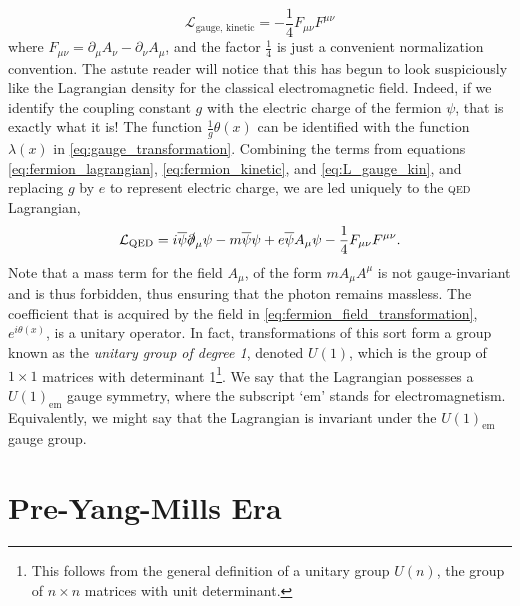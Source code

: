 %
\begin{equation}\label{eq:L_gauge_kin}
\mathcal{L}_\text{gauge, kinetic} = -\frac{1}{4}F_{\mu\nu}F^{\mu\nu}
\end{equation}
%
where $F_{\mu\nu} = \partial_\mu A_\nu - \partial_\nu A_\mu$, and the factor $\frac{1}{4}$ is just a convenient normalization convention. The astute reader will notice that this has begun to look suspiciously like the Lagrangian density for the classical electromagnetic field. Indeed, if we identify the coupling constant $g$ with the electric charge of the fermion $\psi$, that is exactly what it is! The function $\frac{1}{g} \theta(x)$ can be identified with the function $\lambda(x)$ in \eqref{eq:gauge_transformation}. Combining the terms from equations \ref{eq:fermion_lagrangian}, \ref{eq:fermion_kinetic}, and \ref{eq:L_gauge_kin}, and replacing $g$ by $e$ to represent electric charge, we are led uniquely to the \textsc{qed} Lagrangian,
\begin{equation}
  \mathcal{L}_\text{QED} = i\overline{\psi}\slashed{\partial}_\mu\psi - m\overline{\psi}\psi + e\overline{\psi}A_\mu\psi -\frac{1}{4}F_{\mu\nu}F^{\mu\nu}.
\end{equation}
Note that a mass term for the field $A_\mu$, of the form $mA_\mu A^\mu$ is not gauge-invariant and is thus forbidden, thus ensuring that the photon remains massless.
The coefficient that is acquired by the field in \eqref{eq:fermion_field_transformation}, $e^{i\theta(x)}$, is a unitary operator. In fact, transformations of this sort form a group known as the \emph{unitary group of degree 1}, denoted $U(1)$, which is the group of $1\times 1$ matrices with determinant 1\footnote{This follows from the general definition of a unitary group $U(n)$, the group of $n\times n$ matrices with unit determinant.}. We say that the Lagrangian possesses a $U(1)_\text{em}$ gauge symmetry, where the subscript `em' stands for electromagnetism. Equivalently, we might say that the Lagrangian is invariant under the $U(1)_\text{em}$ gauge group. 

\section{Pre-Yang-Mills Era}\label{sec:pre_yang_mills}

